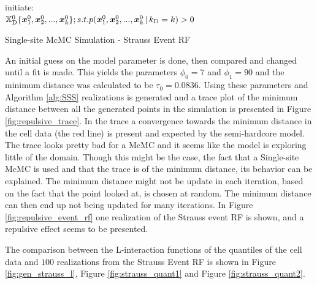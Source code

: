 \begin{algorithm}[H]
\SetAlgoLined
initiate:\\
$\mathbb{X}_\textrm{D}^0\{\bm{x}_1^0,\bm{x}_2^0,...,\bm{x}_k^0\}; s.t. p(\bm{x}_1^0,\bm{x}_2^0,...,\bm{x}_k^0\, | \, k_\textrm{D} = k)>0$\\
\caption{Single-site McMC Simulation - Strauss Event RF}
 \label{alg:SSS}
\end{algorithm} 

An initial guess on the model parameter is done, then compared and changed until a fit is made. This yields the parameters  $\phi_0 = 7$ and $\phi_1 = 90$ and the minimum distance was calculated to be $\tau_0 = 0.0836$. Using these parameters and Algorithm \ref{alg:SSS} realizations is generated and a trace plot of the minimum distance between all the generated points in the simulation is presented in Figure \ref{fig:repulsive_trace}. In the trace a convergence towards the minimum distance in the cell data (the red line) is present and expected by the semi-hardcore model. The trace looks pretty bad for a McMC and it seems like the model is exploring little of the domain. Though this might be the case, the fact that a Single-site McMC is used and that the trace is of the minimum distance, its behavior can be explained. The minimum distance might not be update in each iteration, based on the fact that the point looked at, is chosen at random. The minimum distance can then end up not being updated for many iterations. In Figure \ref{fig:repulsive_event_rf} one realization of the Strauss event RF is shown, and a repulsive effect seems to be presented.  

The comparison between the L-interaction functions of the quantiles of the cell data and $100$ realizations from the Strauss Event RF is shown in Figure \ref{fig:gen_strauss_l}, Figure \ref{fig:strauss_quant1} and Figure \ref{fig:strauss_quant2}. 


